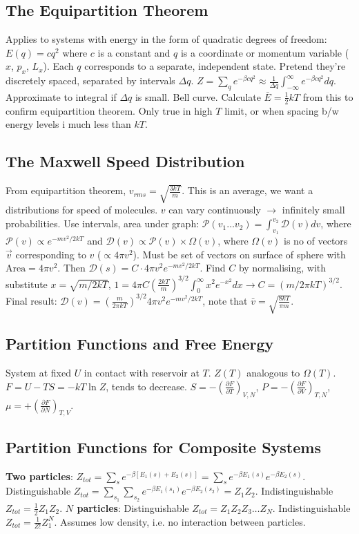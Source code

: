 \documentclass[11pt,twocolumn]{amsart}
\begin{document}
\subsection{The Equipartition Theorem}
Applies to systems with energy in the form of quadratic degrees of freedom: $E(q) = cq^2$ where $c$ is a constant and $q$ is a coordinate or momentum variable ($x$, $p_x$, $L_x$). Each $q$ corresponds to a separate, independent state. Pretend they're discretely spaced, separated by intervals $\Delta q$. $Z=\sum_q e^{-\beta cq^2} \approx \frac{1}{\Delta q} \int_{-\infty}^\infty e^{-\beta cq^2} dq$. Approximate to integral if $\Delta q$ is small. Bell curve. Calculate $\bar{E}=\frac{1}{2}kT$ from this to confirm equipartition theorem. Only true in high $T$ limit, or when spacing b/w energy levels i much less than $kT$.

\subsection{The Maxwell Speed Distribution}
From equipartition theorem, $v_{rms} = \sqrt{\frac{3kT}{m}}$. This is an average, we want a distributions for speed of molecules. $v$ can vary continuously $\rightarrow$ infinitely small probabilities. Use intervals, area under graph: $\mathcal{P}(v_1\dots v_2)=\int_{v_1}^{v_2}\mathcal{D}(v)dv$, where $\mathcal{P}(v) \propto e^{-mv^2/2kT}$ and $\mathcal{D}(v) \propto \mathcal{P}(v) \times \Omega(v)$, where $\Omega (v)$ is no of vectors $\vec{v}$ corresponding to $v$ ($\propto 4\pi v^2$). Must be set of vectors on surface of sphere with $\text{Area} = 4\pi v^2$. Then $\mathcal{D}(s) = C \cdot 4\pi v^2 e^{-mv^2/2kT}$. Find $C$ by normalising, with substitute $x=\sqrt{m/2kT}$, $1 = 4\pi C \left(\frac{2kT}{m} \right)^{3/2} \int_0^\infty x^2e^{-x^2}dx \rightarrow C = (m/2\pi kT)^{3/2}$. Final result: $\mathcal{D}(v) = \left( \frac{m}{2\pi kT}\right)^{3/2} 4\pi v^2 e^{-mv^2/2kT}$, note that $\bar{v}=\sqrt{\frac{8kT}{\pi m}}$.

\subsection{Partition Functions and Free Energy}
System at fixed $U$ in contact with reservoir at $T$. $Z(T)$ analogous to $\Omega(T)$. $F=U-TS=-kT\ln Z$, tends to decrease. $S=-\left(\frac{\partial F}{\partial T}\right)_{V,N}$, $P=-\left(\frac{\partial F}{\partial V}\right)_{T,N}$, $\mu=+\left(\frac{\partial F}{\partial N}\right)_{T,V}$.

\subsection{Partition Functions for Composite Systems}
\textbf{Two particles}: $ Z_{tot} = \sum_s e^{-\beta[E_1(s) + E_2(s)]} = \sum_s e^{-\beta E_1(s)} e^{-\beta E_2(s)}$. Distinguishable $ Z_{tot} = \sum_{s_1} \sum_{s_2} e^{-\beta E_1(s_1)} e^{-\beta E_2(s_2)} = Z_1 Z_2$. Indistinguishable  $Z_{tot} = \frac{1}{2} Z_1 Z_2$. \textbf{$N$ particles}: Distinguishable $ Z_{tot} = Z_1 Z_2 Z_3 \dots Z_N $. Indistinguishable $ Z_{tot} = \frac{1}{Z!}Z_1^N $. Assumes low density, i.e. no interaction between particles.
\end{document}
